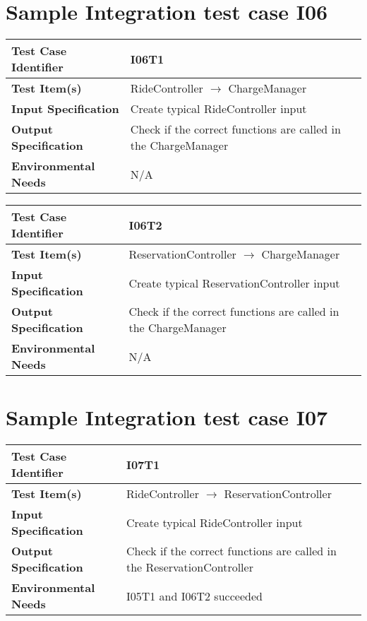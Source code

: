 \section{Sample Integration test case I06}\label{I06}
\begin{center}
	\vspace{0.6cm}
	\begin{tabular}{|l|l|}
		\hline
		\textbf{Test Case Identifier} & I06T1 \bigstrut \\\hline
		\textbf{Test Item(s)} & RideController \ensuremath{\rightarrow} ChargeManager \bigstrut \\\hline
		\textbf{Input Specification} & Create typical RideController input \bigstrut \\\hline
		\textbf{Output Specification} & Check if the correct functions are called in the ChargeManager \bigstrut \\\hline
		\textbf{Environmental Needs} & N/A \bigstrut \\\hline
	\end{tabular}
\end{center}

\begin{center}
	\vspace{0.6cm}
	\begin{tabular}{|l|l|}
		\hline
		\textbf{Test Case Identifier} & I06T2 \bigstrut \\\hline
		\textbf{Test Item(s)} & ReservationController \ensuremath{\rightarrow} ChargeManager \bigstrut \\\hline
		\textbf{Input Specification} & Create typical ReservationController input \bigstrut \\\hline
		\textbf{Output Specification} & Check if the correct functions are called in the ChargeManager \bigstrut \\\hline
		\textbf{Environmental Needs} & N/A \bigstrut \\\hline
	\end{tabular}
\end{center}

\section{Sample Integration test case I07}\label{017}
\begin{center}
	\vspace{0.6cm}
	\begin{tabular}{|l|l|}
		\hline
		\textbf{Test Case Identifier} & I07T1 \bigstrut \\\hline
		\textbf{Test Item(s)} & RideController \ensuremath{\rightarrow} ReservationController \bigstrut \\\hline
		\textbf{Input Specification} & Create typical RideController input \bigstrut \\\hline
		\textbf{Output Specification} & Check if the correct functions are called in the ReservationController \bigstrut \\\hline
		\textbf{Environmental Needs} & I05T1 and I06T2 succeeded \bigstrut \\\hline
	\end{tabular}
\end{center}

